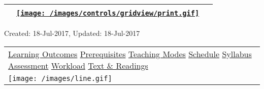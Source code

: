 \hypertarget{ctl00_ctl00_ContentPlaceHolder1_ContentPlaceHolder1_UP}{}
\hypertarget{contentstart}{}
\hypertarget{ctl00_ctl00_ContentPlaceHolder1_ContentPlaceHolder1_pnlMain}{}
\begin{longtable}[]{@{}ll@{}}
\toprule
&
{\href{javascript:PrintThisPage();}{\texttt{[image: /images/controls/gridview/print.gif]}}~~}\tabularnewline
\bottomrule
\end{longtable}

\protect\hypertarget{ctl00_ctl00_ContentPlaceHolder1_ContentPlaceHolder1_LV_UpdateInfo_ctrl0_txtDate}{}{Created:
18-Jul-2017, Updated: 18-Jul-2017}

\begin{longtable}[]{@{}l@{}}
\toprule
\protect\hypertarget{ctl00_ctl00_ContentPlaceHolder1_ContentPlaceHolder1_lblSectionTop}{}{\protect\hyperlink{Learningux5cux2520Outcomes}{Learning
Outcomes} \textbar{} \protect\hyperlink{Prerequisites}{Prerequisites}
\textbar{} \protect\hyperlink{Teachingux5cux2520Modes}{Teaching Modes}
\textbar{} \protect\hyperlink{Schedule}{Schedule} \textbar{}
\protect\hyperlink{Syllabus}{Syllabus} \textbar{}
\protect\hyperlink{Assessment}{Assessment} \textbar{}
\protect\hyperlink{Workload}{Workload} \textbar{}
\protect\hyperlink{References}{Text \& Readings}}\tabularnewline
\texttt{[image: /images/line.gif]}\tabularnewline
\bottomrule
\end{longtable}

